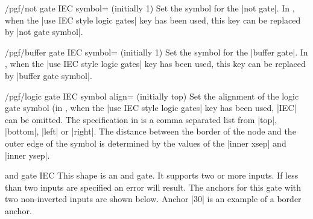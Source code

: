 \begin{key}{/pgf/not gate IEC symbol= (initially 1)}
  Set the symbol for the |not gate|.  
  In \tikzname, when the |use IEC style logic gates| key has been 
  used, this key can be replaced by |not gate symbol|.
\end{key}

\begin{key}{/pgf/buffer gate IEC symbol= (initially 1)}
  Set the symbol for the |buffer gate|.  
  In \tikzname, when the |use IEC style logic gates| key has been 
  used, this key can be replaced by |buffer gate symbol|.
\end{key}

\begin{key}{/pgf/logic gate IEC symbol align= (initially top)}
  Set the alignment of the logic gate symbol (in \tikzname, when the 
  |use IEC style logic gates| key has been used, |IEC| can be omitted.
  The specification in  is a comma separated list from
  |top|, |bottom|, |left| or |right|. The distance between the border
  of the node and the outer edge of the symbol is determined by the values 
  of the |inner xsep| and |inner ysep|.
  
\begin{codeexample}[]
\end{codeexample} 

\end{key}


\begin{shape}{and gate IEC}
  This shape is an and gate. It supports two or more inputs.
  If less than two inputs are specified an error will result. 
	The anchors for this gate with two
  non-inverted inputs are
  shown below. Anchor |30| is an example of a border anchor.
  
\begin{codeexample}[]
\Huge
{}
\end{codeexample}
\end{shape}



